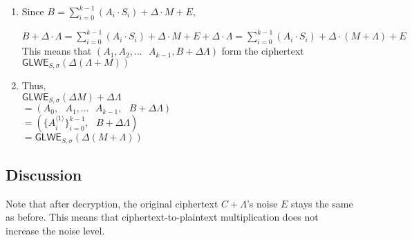 \begin{myproof}

\begin{enumerate}
\item Since $B = \sum\limits_{i=0}^{k-1}{(A_i \cdot S_i)} + \Delta \cdot M + E$,

$B + \Delta \cdot \Lambda = \sum\limits_{i=0}^{k-1}{(A_i \cdot S_i)} + \Delta \cdot M + E + \Delta \cdot \Lambda = \sum\limits_{i=0}^{k-1}{(A_i \cdot S_i)} + \Delta \cdot (M + \Lambda) + E$  \\

This means that $(A_1, A_2, ... \text{ } A_{k-1}
, B + \Delta \Lambda)$ form the ciphertext $\textsf{GLWE}_{S, \sigma}(\Delta (\Lambda + M))$
\item Thus, \\
$\textsf{GLWE}_{S, \sigma}(\Delta M) + \Delta\Lambda$ \\
$ = (A_0, \text { } A_1, ... \text{ } A_{k-1}, \text { } B + \Delta \Lambda)$ \\
$ = (\{A_i^{\langle 1 \rangle}\}_{i=0}^{k-1}, \text { } B + \Delta \Lambda)$ \\
$= \textsf{GLWE}_{S, \sigma}(\Delta (M + \Lambda))$

\end{enumerate}

\end{myproof}


\subsection{Discussion}

 Note that after decryption, the original ciphertext $C +\Lambda$'s noise $E$ stays the same as before. This means that ciphertext-to-plaintext multiplication does not increase the noise level.